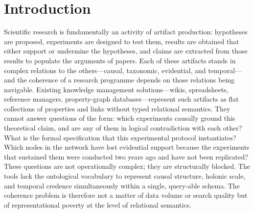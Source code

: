 \documentclass{iosart2x}
\begin{document}
\section{Introduction}
\label{sec:intro}

Scientific research is fundamentally an activity of artifact production: hypotheses are proposed, experiments are designed to test them, results are obtained that either support or undermine the hypotheses, and claims are extracted from those results to populate the arguments of papers. Each of these artifacts stands in complex relations to the others---causal, taxonomic, evidential, and temporal---and the coherence of a research programme depends on those relations being navigable. Existing knowledge management solutions---wikis, spreadsheets, reference managers, property-graph databases---represent such artifacts as flat collections of properties and links without typed relational semantics. They cannot answer questions of the form: which experiments causally ground this theoretical claim, and are any of them in logical contradiction with each other? What is the formal specification that this experimental protocol instantiates? Which nodes in the network have lost evidential support because the experiments that sustained them were conducted two years ago and have not been replicated? These questions are not operationally complex; they are structurally blocked. The tools lack the ontological vocabulary to represent causal structure, holonic scale, and temporal credence simultaneously within a single, query-able schema. The coherence problem is therefore not a matter of data volume or search quality but of representational poverty at the level of relational semantics.
\end{document}
